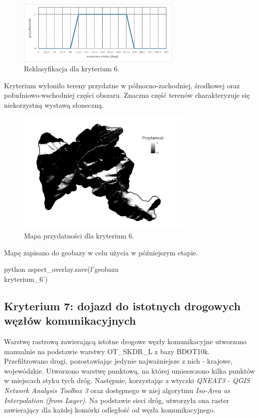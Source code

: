 \documentclass{article}
\begin{document}
\begin{figure}[H]
    \centering
    \includegraphics[width=0.7\textwidth]{img/kryterium6-wykres-glowny.png}
    \caption{Reklasyfikacja dla kryterium 6.}
\end{figure}
\vspace{10pt}

Kryterium wyłoniło tereny przydatne w północno-zachodniej, środkowej oraz południowo-wschodniej części obszaru. Znaczna część terenów charakteryzuje się niekorzystną wystawą słoneczną.
\vspace{5pt}

\begin{figure}[H]
    \centering
    \includegraphics[width=0.75\textwidth]{img/kryterium6-layout.jpg}
    \caption{Mapa przydatności dla kryterium 6.}
\end{figure}
\vspace{10pt}

Mapę zapisano do geobazy w celu użycia w późniejszym etapie.
\vspace{5pt}

\begin{mintedbox}{python}
aspect_overlay.save(f'{geobaza}\\kryterium_6')
\end{mintedbox}

\newpage
\subsection{Kryterium 7: dojazd do istotnych drogowych węzłów komunikacyjnych}
Warstwę rastrową zawierającą istotne drogowe węzły komunikacyjne utworzono manualnie na podstawie warstwy OT\_SKDR\_L z bazy BDOT10k. Przefiltrowano drogi, pozostawiając jedynie najważniejsze z nich - krajowe, wojewódzkie. Utworzono warstwę punktową, na której umieszczono kilka punktów w miejscach styku tych dróg. Następnie, korzystając z wtyczki \textit{QNEAT3 - QGIS Network Analysis Toolbox 3} oraz dostępnego w niej algorytmu \textit{Iso-Area as Interpolation (from Layer)}. Na podstawie sieci dróg, utworzyła ona raster zawierający dla każdej komórki odległość od węzła komunikacyjnego.
\end{document}
